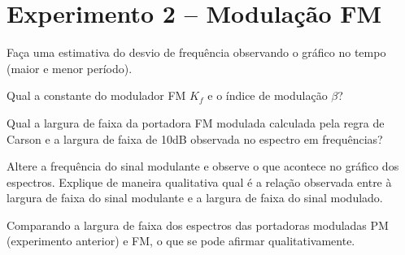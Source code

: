 \documentclass[12pt,addpoints]{exam}
\begin{document}
\section*{Experimento 2 -- Modulação FM}

\begin{questions}
    \question Faça uma estimativa do desvio de frequência observando o gráfico no tempo (maior e menor período). 
    \fillwithlines{0.25in}
    
    \question Qual a constante do modulador FM $K_{f}$ e o índice de modulação $\beta$? %
    \fillwithlines{0.5in}
    
    \question Qual a largura de faixa da portadora FM modulada calculada pela regra de Carson e a largura de faixa de 10dB observada no espectro em frequências?%
    \fillwithlines{0.25in}
    
    \question Altere a frequência do sinal modulante e observe o que acontece no gráfico dos espectros. Explique de maneira qualitativa qual é a relação observada entre à largura de faixa do sinal modulante e a largura de faixa do sinal modulado.
    \fillwithlines{1.1in}
    
    \question Comparando a largura de faixa dos espectros das portadoras moduladas PM (experimento anterior) e FM, o que se pode afirmar qualitativamente.
    \fillwithlines{1.1in}
    
\end{questions}

%
%    
\end{document}
